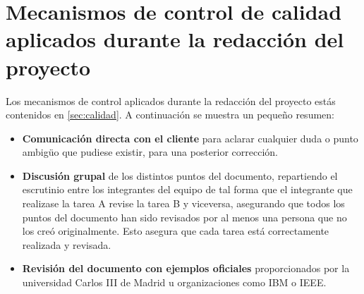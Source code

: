 \section{Mecanismos de control de calidad aplicados durante la redacción del proyecto}
\par Los mecanismos de control aplicados durante la redacción del proyecto estás contenidos en  \ref{sec:calidad}. A continuación se muestra un pequeño resumen:
\begin{itemize}
	\item \textbf{Comunicación directa con el cliente} para aclarar cualquier duda o punto ambigüo que pudiese existir, para una posterior corrección.
	\item \textbf{Discusión grupal} de los distintos puntos del documento, repartiendo el escrutinio entre los integrantes del equipo de tal forma que el integrante que realizase la tarea A revise la tarea B y viceversa, asegurando que todos los puntos del documento han sido revisados por al menos una persona que no los creó originalmente. Esto asegura que cada tarea está correctamente realizada y revisada.
	\item \textbf{Revisión del documento con ejemplos oficiales} proporcionados por la universidad Carlos III de Madrid u organizaciones como IBM o IEEE.
\end{itemize}
